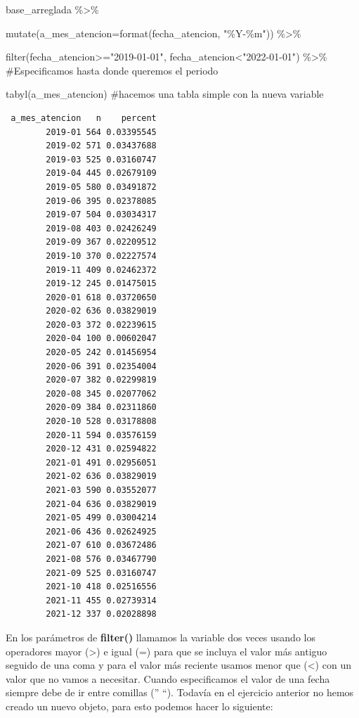 \documentclass[
  letterpaper,
  DIV=11,
  numbers=noendperiod]{scrreprt}
\newenvironment{Shaded}{\begin{snugshade}}{\end{snugshade}}
\newcommand{\AttributeTok}[1]{\textcolor[rgb]{0.40,0.45,0.13}{#1}}
\newcommand{\CommentTok}[1]{\textcolor[rgb]{0.37,0.37,0.37}{#1}}
\newcommand{\FunctionTok}[1]{\textcolor[rgb]{0.28,0.35,0.67}{#1}}
\newcommand{\NormalTok}[1]{\textcolor[rgb]{0.00,0.23,0.31}{#1}}
\newcommand{\SpecialCharTok}[1]{\textcolor[rgb]{0.37,0.37,0.37}{#1}}
\newcommand{\StringTok}[1]{\textcolor[rgb]{0.13,0.47,0.30}{#1}}
\begin{document}
\begin{Shaded}
\begin{Highlighting}[]
\NormalTok{base\_arreglada }\SpecialCharTok{\%\textgreater{}\%} 
  
  \FunctionTok{mutate}\NormalTok{(}\AttributeTok{a\_mes\_atencion=}\FunctionTok{format}\NormalTok{(fecha\_atencion, }\StringTok{"\%Y{-}\%m"}\NormalTok{)) }\SpecialCharTok{\%\textgreater{}\%} 
 
   \FunctionTok{filter}\NormalTok{(fecha\_atencion}\SpecialCharTok{\textgreater{}=}\StringTok{"2019{-}01{-}01"}\NormalTok{, fecha\_atencion}\SpecialCharTok{\textless{}}\StringTok{"2022{-}01{-}01"}\NormalTok{) }\SpecialCharTok{\%\textgreater{}\%}  \CommentTok{\#Especificamos hasta donde queremos el periodo }
  
  \FunctionTok{tabyl}\NormalTok{(a\_mes\_atencion) }\CommentTok{\#hacemos una tabla simple con la nueva variable}
\end{Highlighting}
\end{Shaded}

\begin{verbatim}
 a_mes_atencion   n    percent
        2019-01 564 0.03395545
        2019-02 571 0.03437688
        2019-03 525 0.03160747
        2019-04 445 0.02679109
        2019-05 580 0.03491872
        2019-06 395 0.02378085
        2019-07 504 0.03034317
        2019-08 403 0.02426249
        2019-09 367 0.02209512
        2019-10 370 0.02227574
        2019-11 409 0.02462372
        2019-12 245 0.01475015
        2020-01 618 0.03720650
        2020-02 636 0.03829019
        2020-03 372 0.02239615
        2020-04 100 0.00602047
        2020-05 242 0.01456954
        2020-06 391 0.02354004
        2020-07 382 0.02299819
        2020-08 345 0.02077062
        2020-09 384 0.02311860
        2020-10 528 0.03178808
        2020-11 594 0.03576159
        2020-12 431 0.02594822
        2021-01 491 0.02956051
        2021-02 636 0.03829019
        2021-03 590 0.03552077
        2021-04 636 0.03829019
        2021-05 499 0.03004214
        2021-06 436 0.02624925
        2021-07 610 0.03672486
        2021-08 576 0.03467790
        2021-09 525 0.03160747
        2021-10 418 0.02516556
        2021-11 455 0.02739314
        2021-12 337 0.02028898
\end{verbatim}

En los parámetros de \textbf{filter()} llamamos la variable dos veces
usando los operadores mayor (\textgreater) e igual (=) para que se
incluya el valor más antiguo seguido de una coma y para el valor más
reciente usamos menor que (\textless) con un valor que no vamos a
necesitar. Cuando especificamos el valor de una fecha siempre debe de ir
entre comillas ('' ``). Todavía en el ejercicio anterior no hemos creado
un nuevo objeto, para esto podemos hacer lo siguiente:
\end{document}
